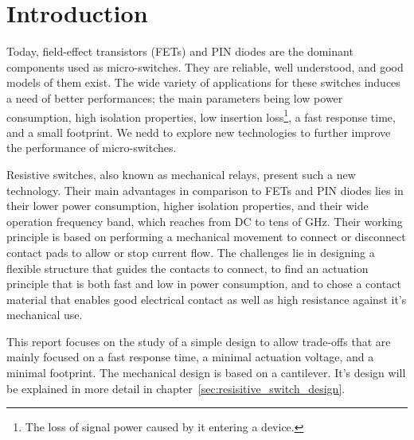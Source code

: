 \section{Introduction}
\label{sec:introduction}
Today, field-effect transistors (FETs) and PIN diodes are the dominant components used as micro-switches. 
They are reliable, well understood, and good models of them exist. 
The wide variety of applications for these switches induces a need of better performances; the main parameters being low power consumption, high isolation properties, low insertion loss\footnote{The loss of signal power caused by it entering a device.}, a fast response time, and a small footprint.
We nedd to explore new technologies to further improve the performance of micro-switches.

Resistive switches, also known as mechanical relays,  present such a new technology.
Their main advantages in comparison to FETs and PIN diodes lies in their lower power consumption, higher isolation properties, and their wide operation frequency band, which reaches from DC to tens of GHz.
Their working principle is based on performing a mechanical movement to connect or disconnect contact pads to allow or stop current flow.
The challenges lie in designing a flexible structure that guides the contacts to connect, to find an actuation principle that is both fast and low in power consumption, and to chose a contact material that enables good electrical contact as well as high resistance against it's mechanical use.

This report focuses on the study of a simple design to allow trade-offs that are mainly focused on a fast response time, a minimal actuation voltage, and a minimal footprint.
The mechanical design is based on a cantilever.
It's design will be explained in more detail in chapter~\ref{sec:resisitive_switch_design}.\cite{shaw2012mems}
